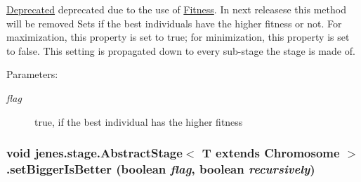 \begin{Desc}
\item[\hyperlink{deprecated__deprecated000002}{Deprecated}]deprecated due to the use of \hyperlink{}{Fitness}. In next releasese this method will be removed Sets if the best individuals have the higher fitness or not. For maximization, this property is set to true; for minimization, this property is set to false. This setting is propagated down to every sub-stage the stage is made of.\end{Desc}
\begin{Desc}
\item[Parameters:]
\begin{description}
\item[{\em flag}]true, if the best individual has the higher fitness \end{description}
\end{Desc}
\hypertarget{classjenes_1_1stage_1_1_abstract_stage_3_01_t_01extends_01_chromosome_01_4_003250025de6f005e247a05b107e5e8f}{
\subsubsection[setBiggerIsBetter]{\setlength{\rightskip}{0pt plus 5cm}void jenes.stage.AbstractStage$<$ T extends Chromosome $>$.setBiggerIsBetter (boolean {\em flag}, \/  boolean {\em recursively})}}
\label{classjenes_1_1stage_1_1_abstract_stage_3_01_t_01extends_01_chromosome_01_4_003250025de6f005e247a05b107e5e8f}



